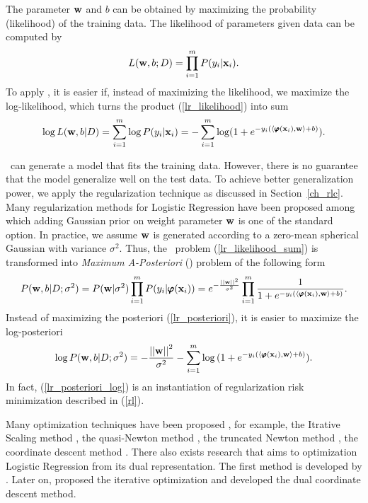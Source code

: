 {%
The parameter $\mathbf {w}$ and $b$ can be obtained by maximizing the probability (likelihood) of the training data.
The likelihood of parameters given data can be computed by
\begin{align}
	L(\mathbf {w},b;D) = \prod_{i=1}^mP(y_i|\mathbf {x}_i). \label{lr_likelihood}
\end{align}
To apply \mle, it is easier if, instead of maximizing the likelihood, we maximize the log-likelihood, which turns the product (\ref{lr_likelihood}) into sum
\begin{align}
	\log L(\mathbf {w},b|D) = \sum_{i=1}^{m}\log P(y_i|\mathbf {x}_i) = -\sum_{i=1}^{m}\log (1+e^{ -y_i(\langle \pmb \varphi(\mathbf {x}_i), \mathbf {w} \rangle+b) }) \label{lr_likelihood_sum}.
\end{align}

\mle\ can generate a model that fits the training data.
However, there is no guarantee that the model generalize well on the test data.
To achieve better generalization power, we apply the regularization technique as discussed in Section~\ref{ch_rlc}.
Many regularization methods for Logistic Regression have been proposed \citep{Chen99,Chen00,Goodman03} among which adding Gaussian prior on weight parameter $\mathbf {w}$ is one of the standard option.
In practice, we assume $\mathbf {w}$ is generated according to a zero-mean spherical Gaussian with variance $\sigma^2$.
Thus, the \mle\ problem (\ref{lr_likelihood_sum}) is transformed into \textit{Maximum A-Posteriori} (\map) problem of the following form
\begin{align}
	P(\mathbf {w},b|D;\sigma^2) = P(\mathbf {w}|\sigma^2)\prod_{i=1}^mP(y_i|\pmb \varphi(\mathbf {x}_i))=e^{ -\frac{\left|\left| \mathbf {w} \right|\right|^2}{\sigma^2} }\prod_{i=1}^{m}{\frac{1}{1+e^{ -y_i(\langle \pmb \varphi(\mathbf {x}_i), \mathbf {w} \rangle+b) }}}. \label{lr_posteriori}
\end{align}
Instead of maximizing the posteriori (\ref{lr_posteriori}), it is easier to maximize the log-posteriori
\begin{align}
	\log P(\mathbf {w},b|D;\sigma^2) = -{\frac{\left|\left| \mathbf {w} \right|\right|^2}{\sigma^2}} - \sum_{i=1}^{m}\log{(1+e^{ -y_i(\langle \pmb \varphi(\mathbf {x}_i), \mathbf {w}\rangle+b) })}. \label{lr_posteriori_log}
\end{align}
In fact, (\ref{lr_posteriori_log}) is an instantiation of regularization risk minimization described in (\ref{rl}).

Many optimization techniques have been proposed \citep{Minka03}, for example, 
the {Itrative Scaling} method \citep{Darroch72,Pietra97inducing,Berger97,Goodman02Sequential,Jin03a},
the quasi-Newton method \citep{Minka03},
the truncated Newton method \citep{Komarek05making,Lin2008trust},
the coordinate descent method \citep{Huang09iterative}.
There also exists research that aims to optimization Logistic Regression from its dual representation.
The first method is developed by \citet{Jaakkola99probabilistic}.
Later on, \citet{Keerthi05a} proposed the iterative optimization and \citet{Yu11dual} developed the dual coordinate descent method.




}
